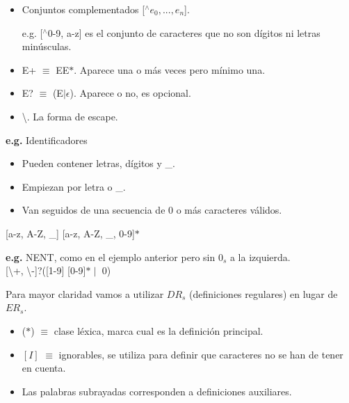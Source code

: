 \documentclass[\main/Apuntes_PL.tex]{subfiles}
\begin{document}
\begin{itemize}
\begin{itemize}
\begin{itemize}
                        \item Conjuntos complementados [$^\wedge e_0, ..., e_n$].
                              \par
                              e.g. [$^\wedge$0-9, a-z] es el conjunto de caracteres que no son dígitos ni letras minúsculas.
                        \item E+ $\equiv$ EE$\ast$. Aparece una o más veces pero mínimo una.
                        \item E? $\equiv$ (E$\mid\epsilon$). Aparece o no, es opcional.
                        \item \textbackslash. La forma de escape.
                      \end{itemize}
              \end{itemize}
      \end{itemize}

      \bigskip
      \par
      \textbf{e.g.} Identificadores
      \begin{itemize}
      \item Pueden contener letras, dígitos y \_.
      \item Empiezan por letra o \_.
      \item Van seguidos de una secuencia de 0 o más caracteres válidos.
      \end{itemize}
      \hspace{5mm}[a-z, A-Z, \_] [a-z, A-Z, \_, 0-9]$\ast$

      \bigskip
      \par
      \textbf{e.g.} NENT, como en el ejemplo anterior pero sin $0_s$ a la izquierda.\\
      \hspace{5mm} [\textbackslash+, \textbackslash -]?([1-9] [0-9]$\ast \mid$ 0)

      \newpage
      \par
      Para mayor claridad vamos a utilizar $DR_s$ (definiciones regulares) en lugar de $ER_s$.
      \begin{itemize}
        \item ($\ast$) $\equiv$ clase léxica, marca cual es la definición principal.
        \item $[I]$ $\equiv$ ignorables, se utiliza para definir que caracteres no se han de tener en cuenta.
        \item Las palabras subrayadas corresponden a definiciones auxiliares.
      \end{itemize}
\end{document}
